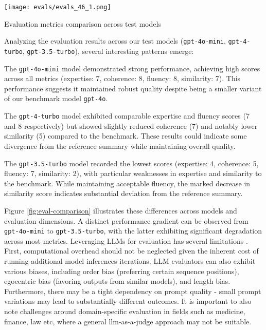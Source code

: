 \begin{marginfigure}
\centering
\texttt{[image: evals/evals\_46\_1.png]}
\caption{Evaluation metrics comparison across test models}
\label{fig:eval-comparison}
\end{marginfigure}

Analyzing the evaluation results across our test models (\texttt{gpt-4o-mini}, \texttt{gpt-4-turbo}, \texttt{gpt-3.5-turbo}), several interesting patterns emerge:

The \texttt{gpt-4o-mini} model demonstrated strong performance, achieving high scores across all metrics (expertise: 7, coherence: 8, fluency: 8, similarity: 7). This performance suggests it maintained robust quality despite being a smaller variant of our benchmark model \texttt{gpt-4o}.

The \texttt{gpt-4-turbo} model exhibited comparable expertise and fluency scores (7 and 8 respectively) but showed slightly reduced coherence (7) and notably lower similarity (5) compared to the benchmark. These results could indicate some divergence from the reference summary while maintaining overall quality.

The \texttt{gpt-3.5-turbo} model recorded the lowest scores (expertise: 4, coherence: 5, fluency: 7, similarity: 2), with particular weaknesses in expertise and similarity to the benchmark. While maintaining acceptable fluency, the marked decrease in similarity score indicates substantial deviation from the reference summary.

Figure \ref{fig:eval-comparison} illustrates these differences across models and evaluation dimensions. A distinct performance gradient can be observed from \texttt{gpt-4o-mini} to \texttt{gpt-3.5-turbo}, with the latter exhibiting significant degradation across most metrics.
Leveraging LLMs for evaluation has several limitations . First, computational overhead should not be neglected given the inherent cost of running additional model inferences iterations. LLM evaluators can also exhibit various biases, including order bias (preferring certain sequence positions), egocentric bias (favoring outputs from similar models), and length bias. Furthermore, there may be a tight dependency on prompt quality - small prompt variations may lead to substantially different outcomes. It is important to also note challenges around domain-specific evaluation in fields such as medicine, finance, law etc, where a general llm-as-a-judge approach may not be suitable.

